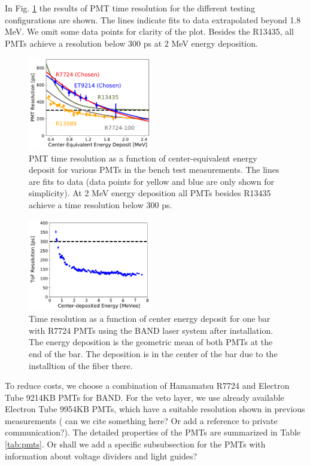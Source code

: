 \documentclass[3p,final,twocolumn]{elsarticle}
\begin{document}
In Fig. \ref{fig:test_stand_results} the results of PMT time resolution for the different testing configurations are shown. The lines indicate fits to data extrapolated beyond 1.8 \si{\mega\electronvolt}. We omit some data points for clarity of the plot. Besides the R13435, all PMTs achieve a resolution below 300 \si{\pico\s} at 2 \si{\mega\electronvolt} energy deposition.
\begin{figure}[tb]
	\centering
		\includegraphics[width=0.48\textwidth]{all-lines-somedata.pdf}
		\caption{PMT time resolution as a function of center-equivalent energy deposit for various PMTs in the bench test measurements. The lines are fits to data (data points for yellow and blue are only shown for simplicity). At 2 \si{\mega\electronvolt} energy deposition all PMTs besides R13435 achieve a time resolution below 300 \si{\pico\s}.}
	\label{fig:test_stand_results}
\end{figure}

\begin{figure}[tb]
	\centering
		\includegraphics[width=0.48\textwidth]{resolution-laser-scan.pdf}
		\caption{Time resolution as a function of center energy deposit for one bar with R7724 PMTs using the BAND laser system after installation. The energy deposition is the geometric mean of both PMTs at the end of the bar. The deposition is in the center of the bar due to the installtion of the fiber there. }
	\label{fig:resolution-laser}
\end{figure}
To reduce costs, we choose a combination of Hamamatsu R7724 \cite{pmtR7724} and Electron Tube 9214KB \cite{pmt9214} PMTs for BAND. For the veto layer, we use already available Electron Tube 9954KB PMTs, which have a suitable resolution shown in previous measurements ({\color{red} can we cite something here? Or add a reference to private communication?}).
The detailed properties of the PMTs are summarized in Table \ref{tab:pmts}. {\color{red}Or shall we add a specific subsubsection for the PMTs with information about voltage dividers and light guides?}
\end{document}
